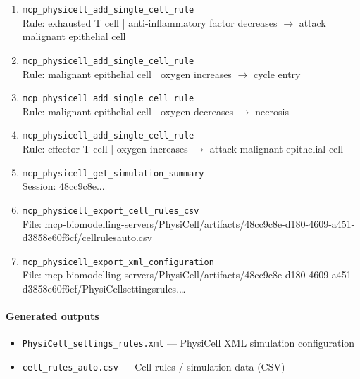 \begin{enumerate}
\item[17.] \texttt{mcp\_\allowbreak{}physicell\_\allowbreak{}add\_\allowbreak{}single\_\allowbreak{}cell\_\allowbreak{}rule}
\hfill\\
\RaggedRight Rule: exhausted T cell | anti-inflammatory factor decreases \ensuremath{\rightarrow} attack malignant epithelial cell
\item[18.] \texttt{mcp\_\allowbreak{}physicell\_\allowbreak{}add\_\allowbreak{}single\_\allowbreak{}cell\_\allowbreak{}rule}
\hfill\\
\RaggedRight Rule: malignant epithelial cell | oxygen increases \ensuremath{\rightarrow} cycle entry
\item[19.] \texttt{mcp\_\allowbreak{}physicell\_\allowbreak{}add\_\allowbreak{}single\_\allowbreak{}cell\_\allowbreak{}rule}
\hfill\\
\RaggedRight Rule: malignant epithelial cell | oxygen decreases \ensuremath{\rightarrow} necrosis
\item[20.] \texttt{mcp\_\allowbreak{}physicell\_\allowbreak{}add\_\allowbreak{}single\_\allowbreak{}cell\_\allowbreak{}rule}
\hfill\\
\RaggedRight Rule: effector T cell | oxygen increases \ensuremath{\rightarrow} attack malignant epithelial cell
\item[21.] \texttt{mcp\_\allowbreak{}physicell\_\allowbreak{}get\_\allowbreak{}simulation\_\allowbreak{}summary}
\hfill\\
\RaggedRight Session: 48cc9c8e...
\item[22.] \texttt{mcp\_\allowbreak{}physicell\_\allowbreak{}export\_\allowbreak{}cell\_\allowbreak{}rules\_\allowbreak{}csv}
\hfill\\
\RaggedRight File: mcp-biomodelling-servers/PhysiCell/artifacts/48cc9c8e-d180-4609-a451-d3858e60f6cf/cellrulesauto.csv
\item[23.] \texttt{mcp\_\allowbreak{}physicell\_\allowbreak{}export\_\allowbreak{}xml\_\allowbreak{}configuration}
\hfill\\
\RaggedRight File: mcp-biomodelling-servers/PhysiCell/artifacts/48cc9c8e-d180-4609-a451-d3858e60f6cf/PhysiCellsettingsrules.\ldots{}
\end{enumerate}
\endgroup

\paragraph{Generated outputs}
\begin{itemize}
\item \texttt{PhysiCell\_\allowbreak{}settings\_\allowbreak{}rules.\allowbreak{}xml} — PhysiCell XML simulation configuration
\item \texttt{cell\_\allowbreak{}rules\_\allowbreak{}auto.\allowbreak{}csv} — Cell rules / simulation data (CSV)
\end{itemize}
